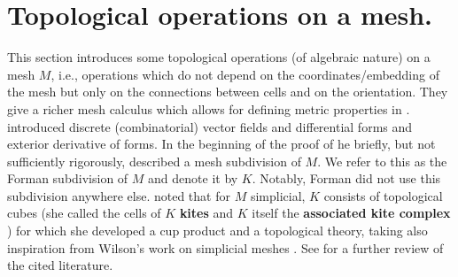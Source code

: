 \documentclass{elsarticle}
\theoremstyle{definition}
\begin{document}
\section{Topological operations on a mesh.}
\label{sec:topology}
This section introduces some topological operations (of algebraic nature) on a mesh $M$, i.e., operations which do not depend on the coordinates/embedding of the mesh but only on the connections between cells and on the orientation. They give a richer mesh calculus which allows for defining metric properties in .
\cite{Forman2002_Novikov} introduced discrete (combinatorial) vector fields and differential forms and exterior derivative of forms. In the beginning of the proof of \cite[Theorem 1.2]{Forman2002_Novikov} he briefly, but not sufficiently rigorously, described a mesh subdivision of $M$. We refer to this as the Forman subdivision of $M$ and denote it by $K$. Notably, Forman did not use this subdivision anywhere else. \cite{arnold2012discrete} noted that for $M$ simplicial, $K$ consists of topological cubes (she called the cells of $K$ \textbf{kites} \cite[Definition 2.1.11]{arnold2012discrete} and $K$ itself the \textbf{associated kite complex} \cite[Definition 5.2.8]{arnold2012discrete}) for which she developed a cup product and a topological theory, taking also inspiration from Wilson's work on simplicial meshes \cite{wilson2007cochain}. See  for a further review of the cited literature.
\end{document}
